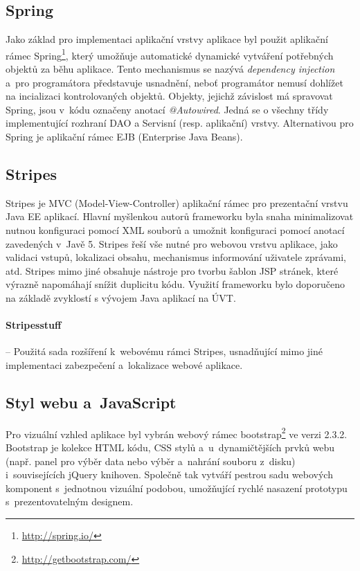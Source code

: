 \documentclass[11pt,draft,oneside]{fithesis2}
\begin{document}
\subsection{Spring}
Jako základ pro implementaci aplikační vrstvy aplikace byl použit aplikační rámec Spring\footnote{\url{http://spring.io/}}, který umožňuje automatické dynamické vytváření potřebných objektů za běhu aplikace. Tento mechanismus se nazývá \textit{dependency injection} a~pro programátora představuje usnadnění, neboť programátor nemusí dohlížet na incializaci kontrolovaných objektů. Objekty, jejichž závislost má spravovat Spring, jsou v~kódu označeny anotací \textit{@Autowired}. Jedná se o všechny třídy implementující rozhraní DAO a Servisní (resp. aplikační) vrstvy.
Alternativou pro Spring je aplikační rámec EJB (Enterprise Java Beans).

\subsection{Stripes}
Stripes je MVC (Model-View-Controller) aplikační rámec pro prezentační vrstvu Java EE aplikací. Hlavní myšlenkou autorů frameworku byla snaha minimalizovat nutnou konfiguraci pomocí XML souborů a umožnit konfiguraci pomocí anotací zavedených v~Javě 5. Stripes řeší vše nutné pro webovou vrstvu aplikace, jako validaci vstupů, lokalizaci obsahu, mechanismus informování uživatele zprávami, atd. Stripes mimo jiné obsahuje nástroje pro tvorbu šablon JSP stránek, které výrazně napomáhají snížit duplicitu kódu.
Využití frameworku bylo doporučeno na základě zvyklostí s vývojem Java aplikací na ÚVT.

\paragraph*{Stripesstuff} -- Použitá sada rozšíření k~webovému rámci Stripes, usnadňující mimo jiné implementaci zabezpečení a~lokalizace webové aplikace. 

\subsection{Styl webu a~JavaScript}
Pro vizuální vzhled aplikace byl vybrán webový rámec bootstrap\footnote{\url{http://getbootstrap.com/}} ve verzi 2.3.2. Bootstrap je kolekce HTML kódu, CSS stylů a~u~dynamičtějších prvků webu (např. panel pro výběr data nebo výběr a~nahrání souboru z~disku) i~souvisejících jQuery knihoven. Společně tak vytváří pestrou sadu webových komponent s~jednotnou vizuální podobou, umožňující rychlé nasazení prototypu s~prezentovatelným designem. 
\end{document}
